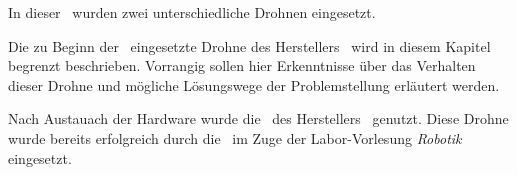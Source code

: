 
In dieser \Arbeit\ wurden zwei unterschiedliche Drohnen eingesetzt.

Die zu Beginn der \Arbeit\ eingesetzte Drohne des Herstellers \COEX\ wird in diesem Kapitel begrenzt beschrieben. Vorrangig sollen hier Erkenntnisse über das Verhalten dieser Drohne und mögliche Lösungswege der Problemstellung erläutert werden.

Nach Austauach der Hardware wurde die \Ar\ des Herstellers \Parrot\ genutzt. Diese Drohne wurde bereits erfolgreich durch die \DHBW\ im Zuge der Labor-Vorlesung \textit{Robotik} eingesetzt.


